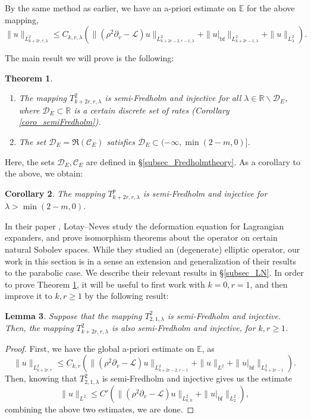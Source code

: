 \documentclass[10pt, a4paper]{article}
\theoremstyle{plain}%
\newtheorem{theorem}{Theorem}[section]
\newtheorem{lem}[theorem]{Lemma}
\newtheorem{coro}[theorem]{Corollary}
\theoremstyle{definition}
\numberwithin{figure}{section}
\numberwithin{equation}{section}
\newcommand{\bR}{\mathbb{R}}
\newcommand{\bE}{\mathbb{E}}
\newcommand{\pa}{\partial}
\newcommand{\cL}{\mathcal{L}}
\newcommand{\botf}{\textrm{bf}}
\newcommand{\cC}{\mathcal{C}}
\newcommand{\cD}{\mathcal{D}}
\begin{document}
By the same method as earlier, we have an a-priori estimate on $\bE$ for the above mapping, \begin{equation}\label{eq_aprioriestimateE}
\|u\|_{L^2_{k+2r,r,\lambda}}\leq C_{k,r,\lambda}\left(\|(\rho^2\pa_v-\cL)u\|_{L^2_{k+2r-2,r-1,\lambda}}+\|u|_{\botf}\|_{L^2_{k+2r-1,\lambda}}+\|u\|_{L^2_\lambda}\right).
\end{equation}

The main result we will prove is the following:
\begin{theorem}\label{thm_mappingE}
\begin{enumerate}
	\item The mapping $T^2_{k+2r,r,\lambda}$ is semi-Fredholm and injective for all $\lambda \in \bR\backslash \cD_E$, where $\cD_E \subset \bR$ is a certain discrete set of rates (Corollary \ref{coro_semiFredholm}). 
	
	\item The set $\cD_E = \Re(\cC_E)$ satisfies $\cD_E\subset (-\infty, \min(2-m,0)]$.
\end{enumerate}
\end{theorem}
Here, the sets $\cD_E,\cC_E$ are defined in \S \ref{subsec_Fredholmtheory}. As a corollary to the above, we obtain:
\begin{coro}
The mapping $T^p_{k+2r,r,\lambda}$ is semi-Fredholm and injective for $\lambda > \min(2-m,0)$.
\end{coro}


In their paper \cite{LN13}, Lotay--Neves study the deformation equation for Lagrangian expanders, and prove isomorphism theorems about the operator on certain natural Sobolev spaces. While they studied an (degenerate) elliptic operator, our work in this section is in a sense an extension and generalization of their results to the parabolic case. We describe their relevant results in \S \ref{subsec_LN}. In order to prove Theorem \ref{thm_mappingE}, it will be useful to first work with $k=0,r=1$, and then improve it to $k,r\geq 1$ by the following result:

\begin{lem}
	Suppose that the mapping $T^2_{2,1,\lambda}$ is semi-Fredholm and injective. Then, the mapping $T^2_{k+2r,r,\lambda}$ is also semi-Fredholm and injective, for $k,r\geq1$. 
\end{lem}
\begin{proof}
	First, we have the global a-priori estimate on $\bE$, as \[
	\|u\|_{L^2_{k+2r,r}}
	\leq C_{k,r}\left(\|(\rho^2\pa_v-\cL)u\|_{L^2_{k+2r-2,r-1}}+\|u\|_{L^2}+\|u|_{\mathrm{bf}}\|_{L^2_{k+2r-1}}\right).
	\]
	Then, knowing that $T^2_{2,1,\lambda}$ is semi-Fredholm and injective gives us the estimate \[
	\|u\|_{L^2}
	\leq C'\left(\|(\rho^2\pa_v-\cL)u\|_{L^2_{0,0}}+\|u|_{\mathrm{bf}}\|_{L^2_{2}}\right),
	\]
	combining the above two estimates, we are done. 
\end{proof}
\end{document}
